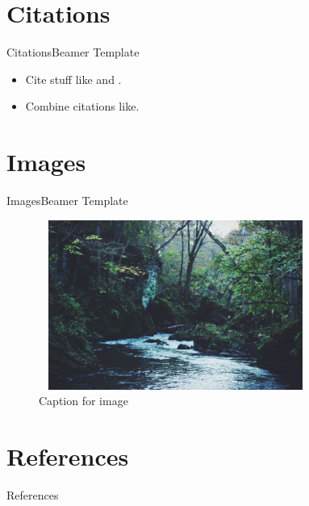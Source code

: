 \documentclass[hyperref={pdfpagemode=UseOutlines}]{beamer}
\numberwithin{equation}{mycounter} %
\numberwithin{table}{mycounter}
\begin{document}
\section{Citations}
\begin{frame}{Citations}{Beamer Template}
    \begin{itemize}
        \item Cite stuff like \cite{article} and \cite{misc}.
        \item Combine citations like\cite{book,incollection}.
    \end{itemize}
\end{frame}

\section{Images}
\begin{frame}{Images}{Beamer Template}
    \begin{figure}
        \begin{minipage}{\textwidth}
            \centering
            \includegraphics[width=0.8\textwidth,height=15em]{stream.jpg}
            \caption{Caption for image}
            \label{fig:sample_figure}
        \end{minipage}
    \end{figure}
\end{frame}

\section{References}
\begin{frame}[allowframebreaks]{References}
    \nocite{*}
    \printbibliography
\end{frame}
\end{document}

